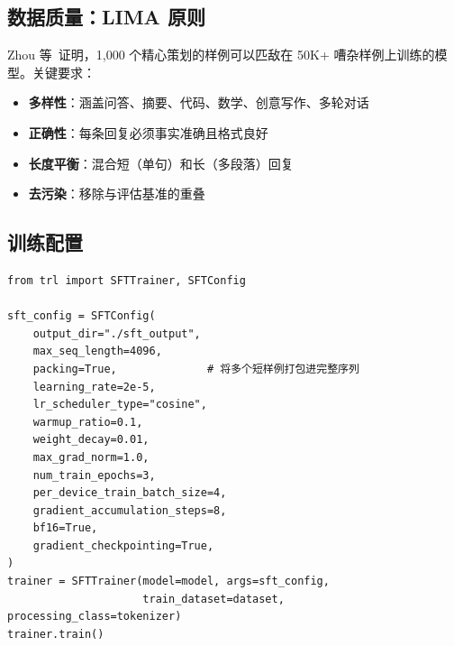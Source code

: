 \subsection{数据质量：LIMA 原则}
\label{data-quality-the-lima-principle}

Zhou 等~\cite{zhou2023lima}证明，1,000 个精心策划的样例可以匹敌在 50K+ 嘈杂样例上训练的模型。关键要求：

\begin{itemize}
  \item \textbf{多样性}：涵盖问答、摘要、代码、数学、创意写作、多轮对话
  \item \textbf{正确性}：每条回复必须事实准确且格式良好
  \item \textbf{长度平衡}：混合短（单句）和长（多段落）回复
  \item \textbf{去污染}：移除与评估基准的重叠
\end{itemize}

\subsection{训练配置}
\label{training-configuration}

\begin{lstlisting}[style=pythonstyle]
from trl import SFTTrainer, SFTConfig

sft_config = SFTConfig(
    output_dir="./sft_output",
    max_seq_length=4096,
    packing=True,              # 将多个短样例打包进完整序列
    learning_rate=2e-5,
    lr_scheduler_type="cosine",
    warmup_ratio=0.1,
    weight_decay=0.01,
    max_grad_norm=1.0,
    num_train_epochs=3,
    per_device_train_batch_size=4,
    gradient_accumulation_steps=8,
    bf16=True,
    gradient_checkpointing=True,
)
trainer = SFTTrainer(model=model, args=sft_config,
                     train_dataset=dataset, processing_class=tokenizer)
trainer.train()
\end{lstlisting}

